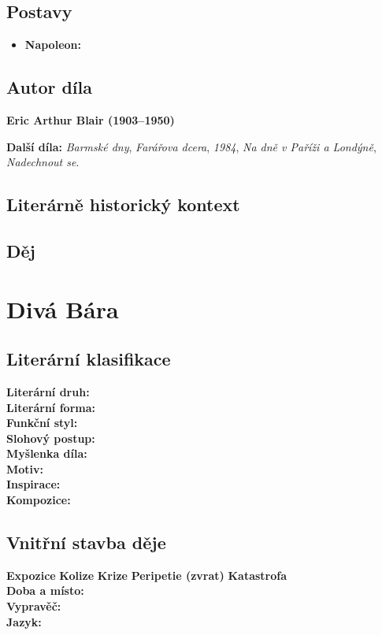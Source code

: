 \documentclass[12pt, a4paper]{article}
\newcommand{\mybf}[1]{\textcolor[RGB]{0, 179, 219}{\textbf{#1}}}
\begin{document}
\subsection*{Postavy}
\begin{itemize}[itemsep=0.3em]
	\item \textbf{Napoleon:}
\end{itemize}

\subsection*{Autor díla}
\textbf{Eric Arthur Blair (1903--1950)}

\textbf{Další díla:} \textit{Barmské dny}, \textit{Farářova dcera}, \textit{1984}, \textit{Na dně v Paříži a Londýně}, \textit{Nadechnout se}.

\subsection*{Literárně historický kontext}

{\color{subsectioncolor}\hrulefill}
\subsection*{\color{subsectioncolor}Děj}

\newpage

\section{Divá Bára}

\subsection*{Literární klasifikace}
\mybf{Literární druh:} \\[3pt]
\mybf{Literární forma:} \\[3pt]
\mybf{Funkční styl:} \\[3pt]
\mybf{Slohový postup:} \\[10pt]
\mybf{Myšlenka díla:} \\[10pt]
\mybf{Motiv:} \\[10pt]
\mybf{Inspirace:} \\[10pt]
\mybf{Kompozice:} 

\subsection*{Vnitřní stavba děje}
\noindent\textbf{Expozice} 
\noindent\textbf{Kolize} 
\noindent\textbf{Krize} 
\noindent\textbf{Peripetie (zvrat)} 
\noindent\textbf{Katastrofa} \\[10pt]
\mybf{Doba a místo:} \\[10pt]
\mybf{Vypravěč:} \\[10pt]
\mybf{Jazyk:} 
\end{document}
